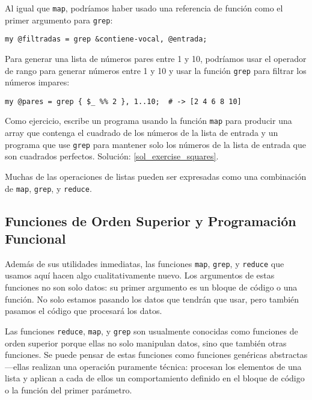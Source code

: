 Al igual que {\tt map}, podríamos haber usado una referencia
de función como el primer argumento para {\tt grep}:

\begin{verbatim}
my @filtradas = grep &contiene-vocal, @entrada;
\end{verbatim}
%

Para generar una lista de números pares entre 1 y 10, podríamos
usar el operador de rango para generar números entre 1 y 10 y
usar la función {\tt grep} para filtrar los números impares:

\begin{verbatim}
my @pares = grep { $_ %% 2 }, 1..10;  # -> [2 4 6 8 10]
\end{verbatim}
%

\label{exercise_squares}
Como ejercicio, escribe un programa usando la función
{\tt map} para producir una array que contenga el cuadrado
de los números de la lista de entrada y un programa que use 
{\tt grep} para mantener solo los números de la lista de entrada
que son cuadrados perfectos. Solución: \ref{sol_exercise_squares}.

Muchas de las operaciones de listas pueden ser expresadas como una
combinación de {\tt map}, {\tt grep}, y {\tt reduce}.

\subsection{Funciones de Orden Superior y Programación Funcional}
\label{array_functional_programming}

Además de sus utilidades inmediatas, las funciones {\tt map},
{\tt grep}, y {\tt reduce} que usamos aquí  hacen algo 
cualitativamente nuevo. Los argumentos de estas funciones 
no son solo datos: su primer argumento es un bloque de
código o una función. No solo estamos pasando los datos
que tendrán que usar, pero también pasamos el código
que procesará los datos.


Las funciones {\tt reduce}, {\tt map}, y {\tt grep} son 
usualmente conocidas como funciones de orden superior porque
ellas no solo manipulan datos, sino que también otras funciones.
Se puede pensar de estas funciones como funciones 
genéricas abstractas---ellas realizan una operación puramente
técnica: procesan los elementos de una lista y aplican 
a cada de ellos un comportamiento definido en el bloque de
código o la función del primer parámetro.

